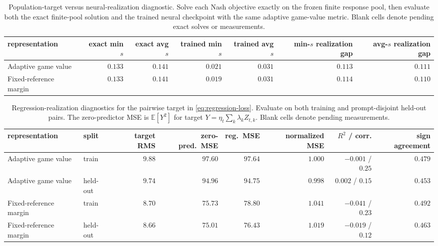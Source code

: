 \documentclass{article}
\theoremstyle{remark}
\theoremstyle{plain}
\newcommand{\E}{\mathbb{E}}
\begin{document}
\begin{table}[t]
\centering\scriptsize
\setlength{\tabcolsep}{3.0pt}
\caption{Population-target versus neural-realization diagnostic. Solve each Nash objective exactly on the frozen finite response pool, then evaluate both the exact finite-pool solution and the trained neural checkpoint with the same adaptive game-value metric. Blank cells denote pending exact solves or measurements.}
\label{tab:finite-pool-realization}
\begin{tabular}{lrrrrrr}
\toprule
representation & exact min $s$ & exact avg $s$ & trained min $s$ & trained avg $s$ & min-$s$ realization gap & avg-$s$ realization gap\\
\midrule
Adaptive game value & $0.133$ & $0.141$ & $0.021$ & $0.031$ & $0.113$ & $0.111$ \\
Fixed-reference margin & $0.133$ & $0.141$ & $0.019$ & $0.031$ & $0.114$ & $0.110$ \\
\bottomrule
\end{tabular}
\end{table}

\begin{table}[t]
\centering\scriptsize
\setlength{\tabcolsep}{2.4pt}
\caption{Regression-realization diagnostics for the pairwise target in \eqref{eq:regression-loss}. Evaluate on both training and prompt-disjoint held-out pairs. The zero-predictor MSE is $\E[Y^2]$ for target $Y=\eta_t\sum_k\lambda_k Z_{t,k}$. Blank cells denote pending measurements.}
\label{tab:regression-realization}
\begin{tabular}{llrrrrrr}
\toprule
representation & split & target RMS & zero-pred.\ MSE & reg.\ MSE & normalized MSE & $R^2$ / corr. & sign agreement\\
\midrule
Adaptive game value & train & $9.88$ & $97.60$ & $97.64$ & $1.000$ & $-0.001$ / $0.25$ & $0.479$ \\
Adaptive game value & held-out & $9.74$ & $94.96$ & $94.75$ & $0.998$ & $0.002$ / $0.15$ & $0.453$ \\
Fixed-reference margin & train & $8.70$ & $75.73$ & $78.80$ & $1.041$ & $-0.041$ / $0.23$ & $0.492$ \\
Fixed-reference margin & held-out & $8.66$ & $75.01$ & $76.43$ & $1.019$ & $-0.019$ / $0.12$ & $0.463$ \\
\bottomrule
\end{tabular}
\end{table}
\end{document}
